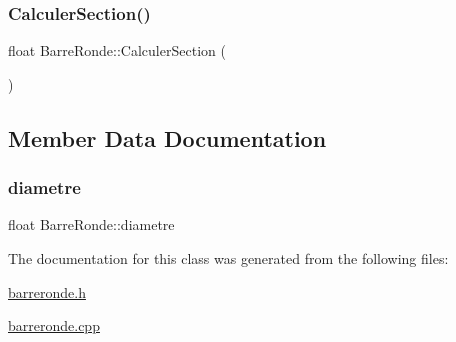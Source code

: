 \subsubsection{\texorpdfstring{Calculer\+Section()}{CalculerSection()}}
{\footnotesize\ttfamily float Barre\+Ronde\+::\+Calculer\+Section (\begin{DoxyParamCaption}{ }\end{DoxyParamCaption})}



\subsection{Member Data Documentation}
\mbox{\label{class_barre_ronde_ac1df0f24c2bbbb4fdb9533fa94639e92}} 
\subsubsection{\texorpdfstring{diametre}{diametre}}
{\footnotesize\ttfamily float Barre\+Ronde\+::diametre\hspace{0.3cm}{\ttfamily [private]}}



The documentation for this class was generated from the following files\+:\begin{DoxyCompactItemize}
\item 
\hyperlink{barreronde_8h}{barreronde.\+h}\item 
\hyperlink{barreronde_8cpp}{barreronde.\+cpp}\end{DoxyCompactItemize}
